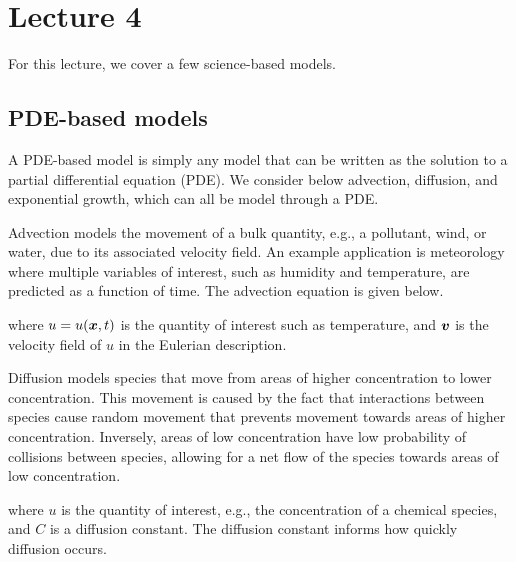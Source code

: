 \chapter{Lecture 4}
For this lecture, we cover a few science-based models.

\section{PDE-based models}
A PDE-based model is simply any model that can be written as the solution to a partial differential equation (PDE). 
We consider below advection, diffusion, and exponential growth, which can all be model through a PDE. 

Advection models the movement of a bulk quantity, e.g., a pollutant, wind, or water, due to its associated velocity field. An example application is meteorology where multiple variables of interest, such as humidity and temperature, are predicted as a function of time. The advection equation is given below.


where $u=u(\boldsymbol{x},t)$ is the quantity of interest such as temperature, and $\boldsymbol{v}$ is the velocity field of $u$ in the Eulerian description. 

Diffusion models species that move from areas of higher concentration to lower concentration. This movement is caused by the fact that interactions between species cause random movement that prevents movement towards areas of higher concentration. Inversely, areas of low concentration have low probability of collisions between species, allowing for a net flow of the species towards areas of low concentration. 


where $u$ is the quantity of interest, e.g., the concentration of a chemical species, and $C$ is a diffusion constant. The diffusion constant informs how quickly diffusion occurs. 

